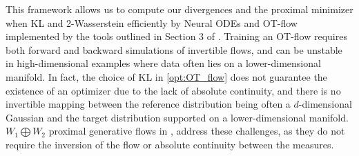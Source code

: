 \documentclass{amsart}
\newcommand{\MK}[1]{\textcolor{orange}{MK: #1}}
\newcommand{\PB}[1]{\textcolor{magenta}{PB: #1}}
\newcommand{\R}{\mathbb{R}}
\theoremstyle{definition}
\theoremstyle{remark}
\numberwithin{equation}{section}
\begin{document}
    This framework allows us to compute our divergences and the proximal minimizer when KL and 2-Wasserstein efficiently by Neural ODEs \cite{NEURALODE} and OT-flow implemented by the tools outlined in Section 3 of \cite{onken2021ot}. 
    Training an OT-flow requires both forward and backward simulations of invertible flows, and can be unstable in high-dimensional examples where data often lies on a lower-dimensional manifold. In fact, the choice of KL in \eqref{opt:OT_flow} does not guarantee the existence of an optimizer due to the lack of absolute continuity, and there is no invertible mapping between  the reference distribution being often a $d$-dimensional Gaussian and the target distribution supported on a lower-dimensional manifold. $W_1\bigoplus W_2$ proximal generative flows in \cite{gu2024combining}, address these challenges, as they do not require the inversion of the flow or absolute continuity between the measures.

\end{document}
